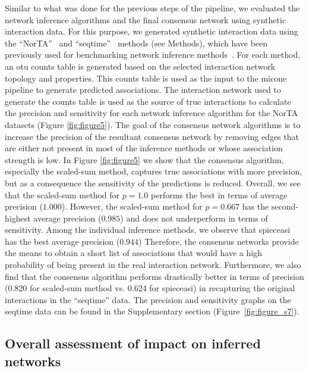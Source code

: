   Similar to what was done for the previous steps of the pipeline, we evaluated the network inference algorithms and the final consensus network using synthetic interaction data.
  For this purpose, we generated synthetic interaction data using the ``NorTA''~\cite{Kurtz2015} and ``seqtime''~\cite{faustSignaturesEcologicalProcesses2018} methods (see Methods), which have been previously used for benchmarking network inference methods~\cite{Kurtz2015,Weiss2016}.
  For each method, an \ac{otu} counts table is generated based on the selected interaction network topology and properties.
  This counts table is used as the input to the \ac{micone} pipeline to generate predicted associations.
  The interaction network used to generate the counts table is used as the source of true interactions to calculate the precision and sensitivity for each network inference algorithm for the NorTA datasets (Figure \ref{fig:figure5}).
  The goal of the consensus network algorithms is to increase the precision of the resultant consensus network by removing edges that are either not present in most of the inference methods or whose association strength is low.
  In Figure \ref{fig:figure5} we show that the consensus algorithm, especially the scaled-sum method, captures true associations with more precision, but as a consequence the sensitivity of the predictions is reduced.
  Overall, we see that the scaled-sum method for $p=1.0$ performs the best in terms of average precision ($1.000$).
  However, the scaled-sum method for $p=0.667$ has the second-highest average precision ($0.985$) and does not underperform in terms of sensitivity.
  Among the individual inference methods, we observe that \ac{spieceasi} has the best average precision ($0.944$)
  Therefore, the consensus networks provide the means to obtain a short list of associations that would have a high probability of being present in the real interaction network.
  Furthermore, we also find that the consensus algorithm performs drastically better in terms of precision (0.820 for scaled-sum method vs. 0.624 for \ac{spieceasi}) in recapturing the original interactions in the ``seqtime'' data.
  The precision and sensitivity graphs on the seqtime data can be found in the Supplementary section (Figure~\ref{fig:figure_s7}).

  \FloatBarrier

  \subsection*{Overall assessment of impact on inferred networks}

